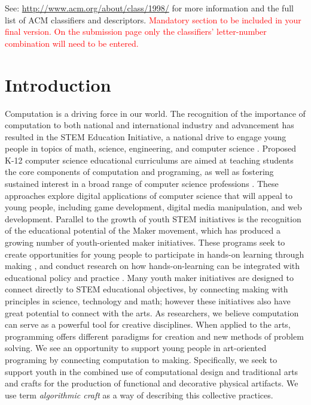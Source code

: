 \documentclass{sigchi}
\begin{document}


See: \url{http://www.acm.org/about/class/1998/}
for more information and the full list of ACM classifiers
and descriptors. 
\textcolor{red}{Mandatory section to be included in your
final version. On the submission page only the classifiers'
letter-number combination will need to be entered.}

\section{Introduction}
Computation is a driving force in our world. The recognition of the importance of computation to both national and international industry and advancement has resulted in the STEM Education Initiative, a national drive to engage young people in topics of math, science, engineering, and computer science \cite{stemReport}. Proposed K-12 computer science educational curriculums are aimed at teaching students the core components of computation and programing, as well as fostering sustained interest in a broad range of computer science professions \cite{k12ModelCur}. These approaches explore digital applications of computer science that will appeal to young people, including game development, digital media manipulation, and web development. Parallel to the growth of youth STEM initiatives is the recognition of the educational potential of the Maker movement, which has produced a growing number of youth-oriented maker initiatives. These programs seek to create opportunities for young people to participate in hands-on learning through making \cite{makerinitiatives}, and conduct research on how hands-on-learning can be integrated with educational policy and practice \cite{maketolearn}. Many youth maker initiatives are designed to connect directly to STEM educational objectives, by connecting making with principles in science, technology and math; however these initiatives also have great potential to connect with the arts. As researchers, we believe computation can serve as a powerful tool for creative disciplines. When applied to the arts, programming offers different paradigms for creation and new methods of problem solving. We see an opportunity to support young people in art-oriented programing by connecting computation to making. Specifically, we seek to support youth in the combined use of computational design and traditional arts and crafts for the production of functional and decorative physical artifacts. We use term \textit{algorithmic craft} as a way of describing this collective practices. 
\end{document}
